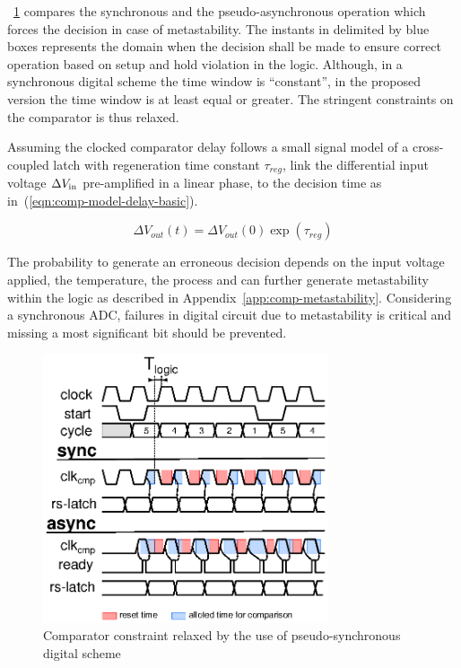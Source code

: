 \figurename~\ref{fig:sar-sync-async} compares the synchronous and the pseudo-asynchronous operation which forces the decision in case of metastability. The instants in delimited by blue boxes represents the domain when the decision shall be made to ensure correct operation based on setup and hold violation in the logic. Although, in a synchronous digital scheme the time window is ``constant'', in the proposed version the time window is at least equal or greater. The stringent constraints on the comparator is thus relaxed. 

Assuming the clocked comparator delay follows a small signal model of a cross-coupled latch with regeneration time constant \(\tau_{reg} \), link the differential input voltage \(\Delta V_{\rm in}\) pre-amplified in a linear phase, to the decision time as in~(\ref{eqn:comp-model-delay-basic}).

\begin{equation}
	\label{eqn:comp-model-delay-basic}
\Delta V_{out}(t) = \Delta V_{out}(0) \exp\left(\tau_{reg}\right)
\end{equation}

The probability to generate an erroneous decision depends on the input voltage applied, the temperature, the process and can further generate metastability  within the logic as described in Appendix~\ref{app:comp-metastability}. Considering a synchronous ADC, failures in digital circuit due to metastability is critical and missing a most significant bit should be prevented.

\begin{figure}[htp]
	\centering
	\includegraphics[width=0.75\textwidth]{Chapter4/Figs/sar-comp-constraint.ps}
	\caption{Comparator constraint relaxed by the use of pseudo-synchronous digital scheme}
	\label{fig:sar-sync-async}
\end{figure}

